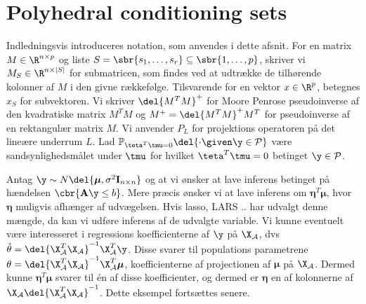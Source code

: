 \section{Polyhedral conditioning sets}
Indledningsvis introduceres notation, som anvendes i dette afsnit.
For en matrix \(M \in \R^{n \times p}\) og liste \(S = \sbr{s_1, \ldots, s_r} \subseteq \sbr{1, \ldots, p}\), skriver vi \(M_S \in \R^{n \times \vert S \vert}\) for submatricen, som findes ved at udtrække de tilhørende kolonner af \(M\) i den givne rækkefølge.
Tilsvarende for en vektor \(x \in \R^p\), betegnes \(x_S\) for subvektoren.
Vi skriver \(\del{M^T M}^+\) for Moore Penrose pseudoinverse af den kvadratiske matrix \(M^T M\) og \(M^+ = \del{M^T M}^+ M^T\) for pseudoinverse af en rektangulær matrix \(M\).
Vi anvender \(P_L\) for projektions operatoren på det lineære underrum \(L\).
Lad \(\mathbb{P}_{\teta^T \tmu = 0} \del{\cdot \given \y \in \mathcal{P}} \) være sandsynlighedsmålet under \(\tmu\) for hvilket \(\teta^T \tmu =0 \) betinget \(\y \in \mathcal{P}\). 

Antag \(\y \sim N\del{\boldsymbol{\mu}, \sigma^2 \mathbf{I}_{n \times n}}\) og at vi ønsker at lave inferens betinget på hændelsen \(\cbr{\mathbf{A} \y \leq b}\).
Mere præcis ønsker vi at lave inferens om \(\boldsymbol{\eta}^T \boldsymbol{\mu}\), hvor \(\boldsymbol{\eta}\) muligvis afhænger af udvægelsen.
Hvis lasso, LARS .. har udvalgt denne mængde, da kan vi udføre inferens  af de udvalgte variable.
Vi kunne eventuelt være interesseret i regressions koefficienterne af \(\y\) på \(\X_\mathcal{A}\), dvs \(\hat{\theta}= \del{\X_\mathcal{A}^T \X_\mathcal{A}}^{-1} \X_\mathcal{A}^T \y\).
Disse svarer til populations parametrene \(\theta= \del{\X_\mathcal{A}^T \X_\mathcal{A}}^{-1} \X_\mathcal{A}^T \boldsymbol{\mu}\), koefficienterne af projectionen af \(\boldsymbol{\mu}\) på \(\X_\mathcal{A}\).
Dermed kunne \(\boldsymbol{\eta}^T \boldsymbol{\mu}\) svarer til én af disse koefficienter, og dermed er \(\boldsymbol{\eta}\) en af kolonnerne af \(\X_\mathcal{A} \del{\X_\mathcal{A}^T \X_\mathcal{A}}^{-1}\). Dette eksempel fortsættes senere.

